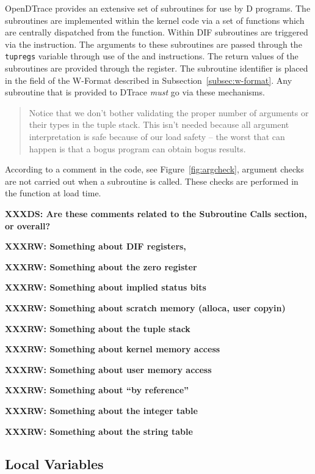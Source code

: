 OpenDTrace provides an extensive set of subroutines for use by D programs.
The subroutines are implemented within the kernel code via a set of
functions which are centrally dispatched from the
 function.  Within DIF subroutines are
triggered via the  instruction. The arguments to
these subroutines are passed through the \verb|tupregs| variable
through use of the  and 
instructions. The return values of the subroutines are provided
through the  register. The subroutine identifier is
placed in the  field of the W-Format described in
Subsection~\ref{subsec:w-format}. Any subroutine that is provided to
DTrace \emph{must} go via these mechanisms.

\begin{quote}
  Notice that we don't bother validating the proper number of
  arguments or their types in the tuple stack.  This isn't needed
  because all argument interpretation is safe because of our load
  safety -- the worst that can happen is that a bogus program can
  obtain bogus results.
\label{fig:argcheck}
\end{quote}

According to a comment in the code, see Figure~\ref{fig:argcheck}, argument
checks are not carried out when a subroutine is called. These checks are
performed in the  function at load time.

\textbf{XXXDS: Are these comments related to the Subroutine Calls section, or
overall?}

\textbf{XXXRW: Something about DIF registers, \nregs{}}

\textbf{XXXRW: Something about the zero register}

\textbf{XXXRW: Something about implied status bits}

\textbf{XXXRW: Something about scratch memory (alloca, user copyin)}

\textbf{XXXRW: Something about the tuple stack}

\textbf{XXXRW: Something about kernel memory access}

\textbf{XXXRW: Something about user memory access}

\textbf{XXXRW: Something about ``by reference''}

\textbf{XXXRW: Something about the integer table}

\textbf{XXXRW: Something about the string table}

\subsection{Local Variables}
\label{sec:local-vars}

